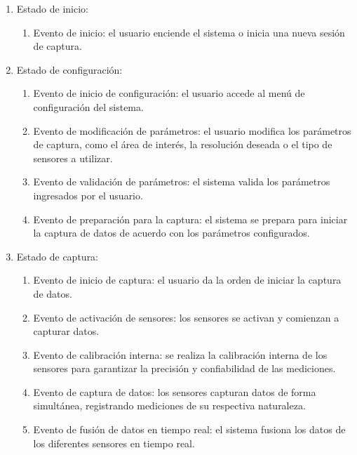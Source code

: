 \documentclass[12pt,a4paper, twoside]{article} %
\begin{document}
\begin{enumerate}

\item Estado de inicio:
\begin{enumerate}
    \item Evento de inicio: el usuario enciende el sistema o inicia una nueva sesión de captura.
\end{enumerate}

\item Estado de configuración:
\begin{enumerate}
    \item Evento de inicio de configuración: el usuario accede al menú de configuración del sistema.
    \item Evento de modificación de parámetros: el usuario modifica los parámetros de captura, como el área de interés, la resolución deseada o el tipo de sensores a utilizar.
    \item Evento de validación de parámetros: el sistema valida los parámetros ingresados por el usuario.
    \item Evento de preparación para la captura: el sistema se prepara para iniciar la captura de datos de acuerdo con los parámetros configurados.
\end{enumerate}

\item Estado de captura:

\begin{enumerate}
    \item Evento de inicio de captura: el usuario da la orden de iniciar la captura de datos.
    \item Evento de activación de sensores: los sensores se activan y comienzan a capturar datos.
    \item Evento de calibración interna: se realiza la calibración interna de los sensores para garantizar la precisión y confiabilidad de las mediciones.
    \item Evento de captura de datos: los sensores capturan datos de forma simultánea, registrando mediciones de su respectiva naturaleza.
    \item Evento de fusión de datos en tiempo real: el sistema fusiona los datos de los diferentes sensores en tiempo real.
\end{enumerate}


\end{enumerate}
\end{document}
